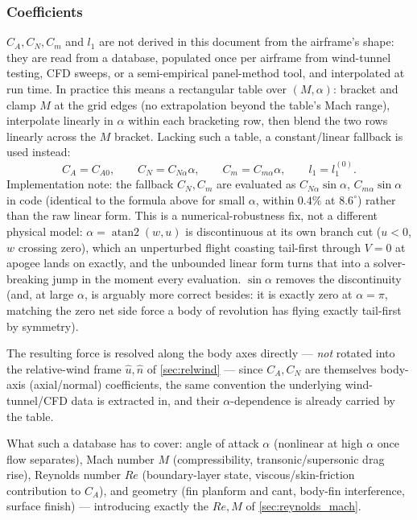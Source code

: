 \subsubsection{Coefficients}
$C_A,C_N,C_m$ and $l_1$ are not derived in this document from the airframe's shape: they are read
from a database, populated once per airframe from wind-tunnel testing, CFD sweeps, or a
semi-empirical panel-method tool, and interpolated at run time. In practice this means a
rectangular table over $(M,\alpha)$: bracket and clamp $M$ at the grid edges (no extrapolation
beyond the table's Mach range), interpolate linearly in $\alpha$ within each bracketing row, then
blend the two rows linearly across the $M$ bracket. Lacking such a table, a constant/linear
fallback is used instead:
\begin{equation}
    C_A = C_{A0}, \qquad C_N = C_{N\alpha}\alpha, \qquad C_m = C_{m\alpha}\alpha, \qquad l_1 = l_1^{(0)}.
\end{equation}
Implementation note: the fallback $C_N,C_m$ are evaluated as $C_{N\alpha}\sin\alpha$,
$C_{m\alpha}\sin\alpha$ in code (identical to the formula above for small $\alpha$, within $0.4\%$
at $8.6^\circ$) rather than the raw linear form. This is a numerical-robustness fix, not a
different physical model: $\alpha=\operatorname{atan2}(w,u)$ is discontinuous at its own branch
cut ($u<0$, $w$ crossing zero), which an unperturbed flight coasting tail-first through $V=0$ at
apogee lands on exactly, and the unbounded linear form turns that into a solver-breaking jump in
the moment every evaluation. $\sin\alpha$ removes the discontinuity (and, at large $\alpha$, is
arguably more correct besides: it is exactly zero at $\alpha=\pi$, matching the zero net side
force a body of revolution has flying exactly tail-first by symmetry).

The resulting force is resolved along the body axes directly --- \emph{not} rotated into the
relative-wind frame $\hat{u},\hat{n}$ of \autoref{sec:relwind} --- since $C_A,C_N$ are themselves
body-axis (axial/normal) coefficients, the same convention the underlying wind-tunnel/CFD data is
extracted in, and their $\alpha$-dependence is already carried by the table.

What such a database has to cover: angle of attack $\alpha$ (nonlinear at high $\alpha$ once flow
separates), Mach number $M$ (compressibility, transonic/supersonic drag rise), Reynolds number
$Re$ (boundary-layer state, viscous/skin-friction contribution to $C_A$), and geometry (fin
planform and cant, body-fin interference, surface finish) --- introducing exactly the $Re,M$ of
\autoref{sec:reynolds_mach}.

